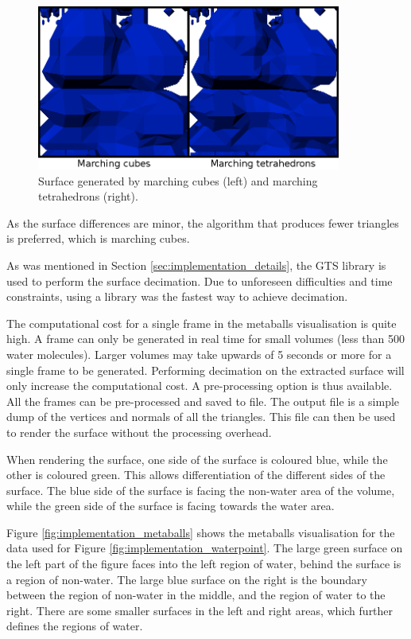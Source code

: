 \begin{figure}
  \begin{center}
    \includegraphics[width=100mm]{surface_compare}
  \end{center}
  \caption{Surface generated by marching cubes (left) and marching tetrahedrons
  (right).}
  \label{fig:implementation_compare}
\end{figure}

As the surface differences are minor, the algorithm that produces fewer
triangles is preferred, which is marching cubes.



As was mentioned in Section \ref{sec:implementation_details}, the GTS library
is used to perform the surface decimation. Due to unforeseen difficulties and
time constraints, using a library was the fastest way to achieve decimation.

The computational cost for a single frame in the metaballs visualisation is
quite high. A frame can only be generated in real time for small volumes (less
than 500 water molecules). Larger volumes may take upwards of 5 seconds or more
for a single frame to be generated. Performing decimation on the extracted
surface will only increase the computational cost. A pre-processing option is
thus available. All the frames can be pre-processed and saved to file. The
output file is a simple dump of the vertices and normals of all the triangles.
This file can then be used to render the surface without the processing
overhead.

When rendering the surface, one side of the surface is coloured blue, while the
other is coloured green. This allows differentiation of the different sides of
the surface. The blue side of the surface is facing the non-water area of the
volume, while the green side of the surface is facing towards the water area.

Figure \ref{fig:implementation_metaballs} shows the metaballs visualisation for
the data used for Figure \ref{fig:implementation_waterpoint}. The large green
surface on the left part of the figure faces into the left region of water,
behind the surface is a region of non-water. The large blue surface on the
right is the boundary between the region of non-water in the middle, and the
region of water to the right. There are some smaller surfaces in the left and
right areas, which further defines the regions of water.

